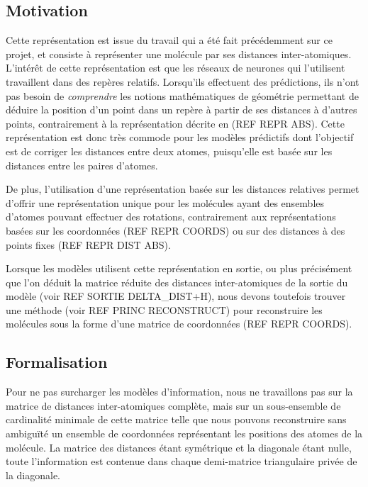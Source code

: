 \subsection{Motivation}

\par Cette représentation est issue du travail qui a été fait précédemment sur ce projet, et consiste à représenter une molécule par ses distances inter-atomiques. L'intérêt de cette représentation est que les réseaux de neurones qui l'utilisent travaillent dans des repères relatifs. Lorsqu'ils effectuent des prédictions, ils n'ont pas besoin de \textit{comprendre} les notions mathématiques de géométrie permettant de déduire la position d'un point dans un repère à partir de ses distances à d'autres points, contrairement à la représentation décrite en (REF REPR ABS). Cette représentation est donc très commode pour les modèles prédictifs dont l'objectif est de corriger les distances entre deux atomes, puisqu'elle est basée sur les distances entre les paires d'atomes.

\par De plus, l'utilisation d'une représentation basée sur les distances relatives permet d'offrir une représentation unique pour les molécules ayant des ensembles d'atomes pouvant effectuer des rotations, contrairement aux représentations basées sur les coordonnées (REF REPR COORDS) ou sur des distances à des points fixes (REF REPR DIST ABS).

\par Lorsque les modèles utilisent cette représentation en sortie, ou plus précisément que l'on déduit la matrice réduite des distances inter-atomiques de la sortie du modèle (voir REF SORTIE DELTA\_DIST+H), nous devons toutefois trouver une méthode (voir REF PRINC RECONSTRUCT) pour reconstruire les molécules sous la forme d'une matrice de coordonnées (REF REPR COORDS).

\subsection{Formalisation}

\par Pour ne pas surcharger les modèles d'information, nous ne travaillons pas sur la matrice de distances inter-atomiques complète, mais sur un sous-ensemble de cardinalité minimale de cette matrice telle que nous pouvons reconstruire sans ambiguïté un ensemble de coordonnées représentant les positions des atomes de la molécule. La matrice des distances étant symétrique et la diagonale étant nulle, toute l'information est contenue dans chaque demi-matrice triangulaire privée de la diagonale. \\


